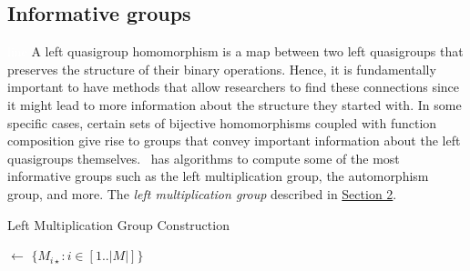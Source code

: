 \subsection{Informative groups}\textcolor{white}{line}\newline
\noindent A left quasigroup homomorphism is a map between two left quasigroups that preserves the structure of their binary operations. Hence, it is fundamentally important to have methods that allow researchers to find these connections since it might lead to more information about the structure they started with. 
In some specific cases, certain sets of bijective homomorphisms coupled with function composition give rise to groups that convey important information about the left quasigroups themselves. \Software~has algorithms to compute some of the most informative groups such as the left multiplication group, the automorphism group, and more.\newline\newline
\noindent The \emph{left multiplication group} described in \hyperref[leftmultiplicationgroup]{Section 2}.\newline

\begin{algorithm}[H]
\DontPrintSemicolon
\caption{Left Multiplication Group Construction}
\BlankLine
\BlankLine
{}
\Ls $\leftarrow$ $\{ M_{i\star} : i \in [1..|M|]\}$\;
\;
\end{algorithm}\vspace{0.9em}

